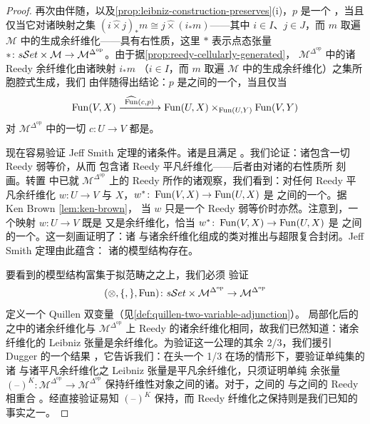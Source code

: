 \begin{proof}
再次由伴随，以及\cref{prop:leibniz-construction-preserves}(i)，$p$ 是一个%
\trRezkIsofibration，当且仅当它对诸映射之集
$(i\mathbin{\widehat{\times}}j)_{\ast}m\cong j\mathbin{\widehat{\times}}(i_{\ast}m)$——其中 $i\in I$、$j\in J$，而 $m$
取遍 $\mathcal{M}$ 中的生成余纤维化——具有右\trLifting{}性质，这里 $\ast$
表示点态张量 $\ast\colon s\mathcal{S}et\times\mathcal{M}\to\mathcal{M}^{\Delta^{\mathrm{op}}}$。由于据\cref{prop:reedy-cellularly-generated}，
$\mathcal{M}^{\Delta^{\mathrm{op}}}$ 中的诸 Reedy 余纤维化由诸映射 $i_{\ast}m$
（$i\in I$，而 $m$ 取遍 $\mathcal{M}$ 中的生成余纤维化）之集所胞腔式生成，我们
由伴随得出结论：$p$ 是\trRezkObject{}之间的一个\trRezkIsofibration，当且仅当
\[
\operatorname{Fun}(V,X)\xrightarrow{\ \widehat{\operatorname{Fun}}(c,p)\ }
\operatorname{Fun}(U,X)\times_{\operatorname{Fun}(U,Y)}\operatorname{Fun}(V,Y)
\]
对 $\mathcal{M}^{\Delta^{\mathrm{op}}}$ 中的一切\trMonomorphism{}
$c\colon U\to V$ 都是\trIsofibration。

现在容易验证 Jeff Smith 定理的诸条件。诸\trRezkWeakEquivalence{}是\trAccessible{}且满足%
\trTwoOfThreeProperty。我们论证：诸\trRezkWeakEquivalence{}包含一切 Reedy 弱等价，从而
包含诸 Reedy 平凡纤维化——后者由对诸\trMonomorphism{}的右\trLifting{}性质所
刻画。转置 \cite[4.4]{bib35} 中已就 $\mathcal{M}^{\Delta^{\mathrm{op}}}$ 上的
Reedy \trModelStructure{}所作的诸观察，我们看到：对任何 Reedy 平凡余纤维化
$w\colon U\to V$ 与\trRezkObject{} $X$，$w^{\ast}\colon\operatorname{Fun}(V,X)\to\operatorname{Fun}(U,X)$ 是%
\trQuasiCategory{}之间的一个\trEquivalence。据 Ken Brown \cref{lem:ken-brown}，
当 $w$ 只是一个 Reedy 弱等价时亦然。注意到，一个映射 $w\colon U\to V$ 既是%
\trRezkWeakEquivalence{}又是余纤维化，恰当 $w^{\ast}\colon\operatorname{Fun}(V,X)\to\operatorname{Fun}(U,X)$ 是%
\trQuasiCategory{}之间的一个\trTrivialFibration。这一刻画证明了：诸%
\trRezkWeakEquivalence{}与诸余纤维化组成的类对推出与超限复合封闭。Jeff Smith 定理由此蕴含：
诸\trRezkObject{}的模型结构存在。

要看到\trRezkObject{}的模型结构富集于拟范畴之\trModelStructure{}之上，我们必须
验证
\[
(\otimes,\{,\},\operatorname{Fun})\colon s\mathcal{S}et\times\mathcal{M}^{\Delta^{\mathrm{op}}}
\to\mathcal{M}^{\Delta^{\mathrm{op}}}
\]
定义一个 Quillen 双变量\trAdjunction（见\cref{def:quillen-two-variable-adjunction}）。
局部化后的\trRezkObject{}之\trModelStructure{}中的诸余纤维化与 $\mathcal{M}^{\Delta^{\mathrm{op}}}$
上 Reedy \trModelStructure{}的诸余纤维化相同，故我们已然知道：诸余纤维化的
Leibniz 张量是余纤维化。为验证这一公理的其余 2/3，我们援引 Dugger 的一个结果
\cite[3.2]{bib35}，它告诉我们：在头一个 1/3 在场的情形下，要验证单纯集的诸%
\trMonomorphism{}与诸平凡余纤维化之 Leibniz 张量是平凡余纤维化，只须证明单纯
余张量 $(\text{--})^{K}\colon\mathcal{M}^{\Delta^{\mathrm{op}}}\to\mathcal{M}^{\Delta^{\mathrm{op}}}$
保持纤维性对象之间的诸\trFibration。对于\trBousfieldLocalization，\trRezkObject{}之间的%
\trRezkIsofibration{}与\trRezkObject{}之间的 Reedy \trFibration{}相重合%
\cite[3.3.16]{bib55}。经直接验证易知 $(\text{--})^{K}$ 保持\trRezkObject，而
Reedy 纤维化之保持则是我们已知的事实之一。


\end{proof}
